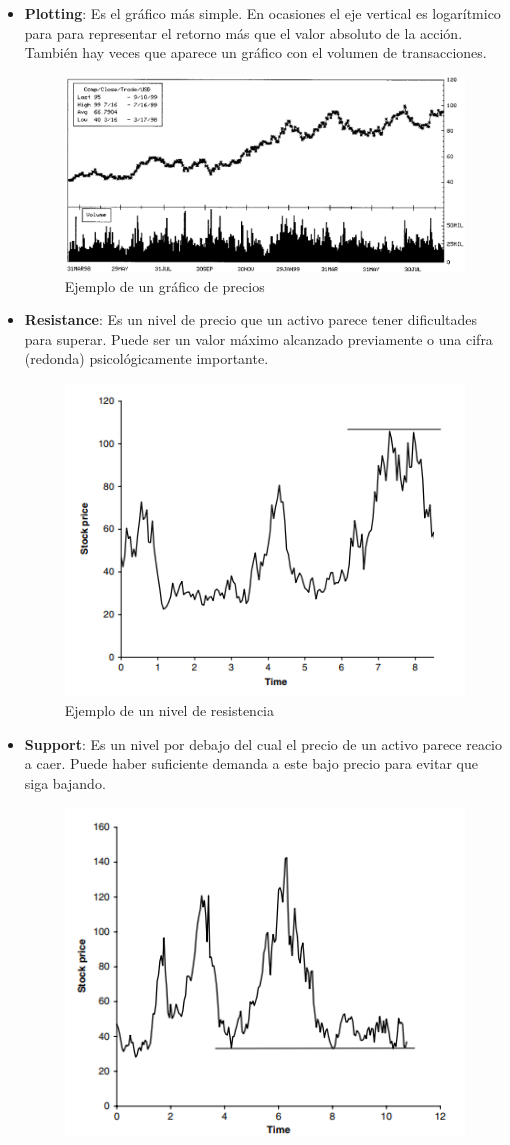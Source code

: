\begin{itemize}
    \item \textbf{Plotting}: Es el gráfico más simple. En ocasiones el eje vertical es logarítmico para para representar el retorno más que el valor absoluto de la acción. También hay veces que aparece un gráfico con el volumen de transacciones.
        \begin{figure}[H]
            \centering
            \includegraphics[width=0.65\linewidth]{Imagenes/16_Prediccion/Plotting.png}
            \caption{Ejemplo de un gráfico de precios}
        \end{figure}
    \item \textbf{Resistance}: Es un nivel de precio que un activo parece tener dificultades para superar. Puede ser un valor máximo alcanzado previamente o una cifra (redonda) psicológicamente importante.
        \begin{figure}[H]
            \centering
            \includegraphics[width=0.65\linewidth]{Imagenes/16_Prediccion/Resistance.png}
            \caption{Ejemplo de un nivel de resistencia}
        \end{figure}
    \item \textbf{Support}: Es un nivel por debajo del cual el precio de un activo parece reacio a caer. Puede haber suficiente demanda a este bajo precio para evitar que siga bajando.
        \begin{figure}[H]
            \centering
            \includegraphics[width=0.65\linewidth]{Imagenes/16_Prediccion/Support.png}

\end{figure}
\end{itemize}
